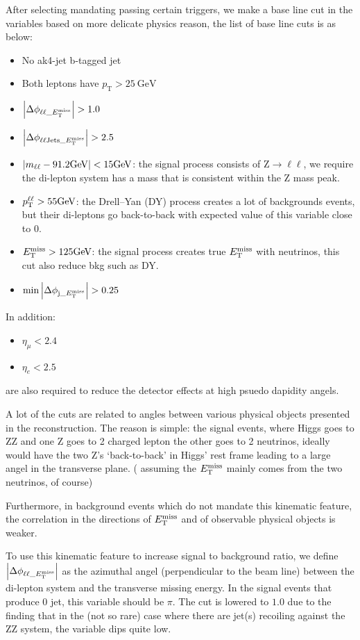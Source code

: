 After selecting mandating passing certain triggers, we make a base line cut in the variables
based on more delicate physics reason, the list of base line cuts is as below:
\begin{itemize}
    \item No ak4-jet b-tagged jet
    \item Both leptons have $p_\mathrm{T} > \SI{25}{\giga\electronvolt}$
    \item $\abs{\Delta\phi_{\ell\ell\_E_{\mathrm{T}}^{\mathrm{miss}}}} > 1.0$
    \item $\abs{\Delta\phi_{\ell\ell\mathrm{Jets}\_E_{\mathrm{T}}^{\mathrm{miss}}}} > 2.5$
    \item $\abs{m_{\ell\ell} - 91.2\si{\giga\electronvolt}} < 15\si{\giga\electronvolt}$:
        the signal process consists of $\mathrm{Z}\rightarrow{}\ell\ell$, we
        require the di-lepton system has a mass that is consistent within the Z mass peak.
    \item $p_\mathrm{T}^{\ell\ell} > 55\si{\giga\electronvolt}$: 
        the Drell–Yan (DY) process creates a lot of backgrounds events, but their di-leptons
        go back-to-back with expected value of this variable close to 0.
    \item $E_{\mathrm{T}}^{\mathrm{miss}} > 125\si{\giga\electronvolt}$:
        the signal process creates true $E_{\mathrm{T}}^{\mathrm{miss}}$ with neutrinos, this cut also reduce bkg such
        as DY.
    \item $\min{\abs{ \Delta\phi_{\mathrm{j}\_E_{\mathrm{T}}^{\mathrm{miss}}}}} > 0.25$
\end{itemize}
In addition:
\begin{itemize}
    \item $\eta_\mu< 2.4$
    \item $\eta_e< 2.5$
\end{itemize}
are also required to reduce the detector effects at high psuedo dapidity angels.

A lot of the cuts are related to angles between various physical objects presented in the
reconstruction. The reason is simple: the signal events, where Higgs goes to ZZ and one Z
goes to 2 charged lepton the other goes to 2 neutrinos, ideally would have the two Z's 
`back-to-back' in Higgs' rest frame leading to a large angel in the transverse plane. (
assuming the $E_{\mathrm{T}}^{\mathrm{miss}}$ mainly comes from the two neutrinos, of course)

Furthermore, in background events which do not mandate this kinematic feature, the
correlation in the directions of $E_{\mathrm{T}}^{\mathrm{miss}}$ and of observable physical objects is weaker.

To use this kinematic feature to increase signal to background ratio, we define 
$\abs{\Delta\phi_{\ell\ell\_E_{\mathrm{T}}^{\mathrm{miss}}}}$ as the azimuthal angel (perpendicular to 
the beam line) between the di-lepton system and the transverse missing energy. In the
signal events that produce 0 jet, this variable should be $\pi$. The cut is lowered to $1.0$ 
due to the finding that in the (not so rare) case where there are jet(s) recoiling against
the ZZ system, the variable dips quite low.

